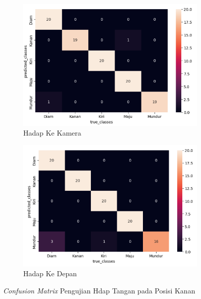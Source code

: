 \begin{enumerate}
  \begin{figure}[H]
    \centering
    \begin{subfigure}{0.7\textwidth}
      \centering
      \includegraphics[width=\linewidth]{../Gambar/cmkananhadapkamera.png}
      \caption{Hadap Ke Kamera}
      \label{fig:cmkanankamera}
    \end{subfigure}
    \begin{subfigure}{0.7\textwidth}
      \centering
      \includegraphics[width=\linewidth]{../Gambar/cmkananhadaplurus.png}
      \caption{Hadap Ke Depan}
      \label{fig:cmkananlurus}
    \end{subfigure}
    \centering
    \caption{\emph{Confusion Matrix} Pengujian Hdap Tangan pada Posisi Kanan}
    \label{fig:cmkanan}
  \end{figure}


\end{enumerate}
